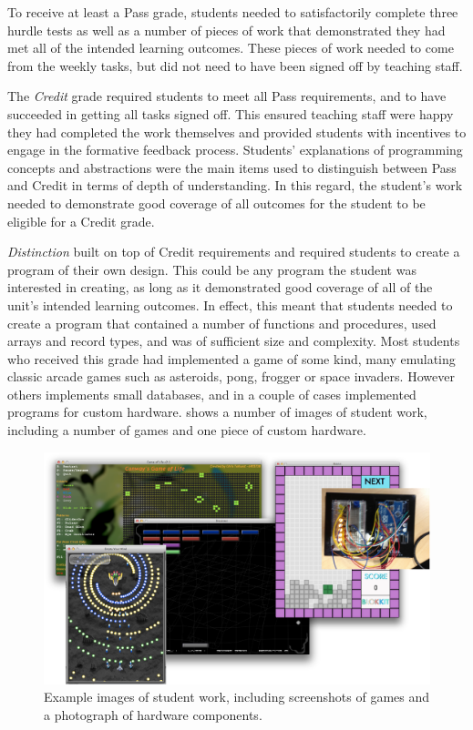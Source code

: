 To receive at least a Pass grade, students needed to satisfactorily complete three hurdle tests as well as a number of pieces of work that demonstrated they had met all of the intended learning outcomes. These pieces of work needed to come from the weekly tasks, but did not need to have been signed off by teaching staff. 

The \emph{Credit} grade required students to meet all Pass requirements, and to have succeeded in getting all tasks signed off. This ensured teaching staff were happy they had completed the work themselves and provided students with incentives to engage in the formative feedback process. Students' explanations of programming concepts and abstractions were the main items used to distinguish between Pass and Credit in terms of depth of understanding. In this regard, the student's work needed to demonstrate good coverage of all outcomes for the student to be eligible for a Credit grade.

\emph{Distinction} built on top of Credit requirements and required students to create a program of their own design. This could be any program the student was interested in creating, as long as it demonstrated good coverage of all of the unit's intended learning outcomes. In effect, this meant that students needed to create a program that contained a number of functions and procedures, used arrays and record types, and was of sufficient size and complexity. Most students who received this grade had implemented a game of some kind, many emulating classic arcade games such as asteroids, pong, frogger or space invaders. However others implements small databases, and in a couple of cases implemented programs for custom hardware.  shows a number of images of student work, including a number of games and one piece of custom hardware.

\begin{figure}[htbp]
	\centering
	\includegraphics[width=\textwidth]{StudentGames}
	\caption{Example images of student work, including screenshots of games and a photograph of hardware components.  }
	\label{fig:student_games}
\end{figure}

